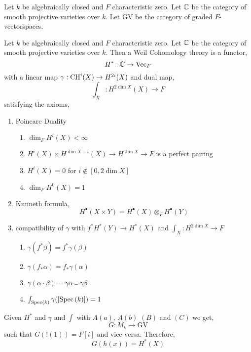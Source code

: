 \documentclass[12pt]{article}
\begin{document}
\newcommand{\GV}{\mathrm{GV}}
\newcommand{\ch}{\mathrm{ch}}
\newcommand{\finfield}{\mathbb{F}}

\begin{definition}
Let $k$ be algebraically closed and $F$ characteristic zero. Let $\mathbb{C}$ be the category of smooth projective varieties over $k$. Let $\GV$ be the category of graded $F$-vectorspaces. 
\end{definition}

\begin{definition}
Let $k$ be algebraically closed and $F$ characteristic zero. Let $\mathbb{C}$ be the category of smooth projective varieties over $k$. Then a Weil Cohomology theory is a functor,
\[ H^* : \mathbb{C} \to \mathrm{Vec}_F \]
with a linear map $\gamma : \mathrm{CH}^i(X) \to H^{2i}(X)$ and dual map,
\[ \int_X : H^{2 \dim{X}}(X) \to F \] 
satisfying the axioms,
\begin{enumerate}
\item Poincare Duality
\begin{enumerate}
\item $\dim_F H^i(X) < \infty$
\item $H^i(X) \times H^{\dim{X} - i}(X) \to H^{\dim{X}}  \to F$ is a perfect pairing
\item $H^i(X) = 0$ for $i \notin [0, 2 \dim{X}]$
\item $\dim_F H^0(X) = 1$
\end{enumerate}
\item Kunneth formula,
\[ H^\bullet(X \times Y) = H^\bullet(X) \otimes_F H^\bullet(Y) \]
\item compatibility of $\gamma$ with $f^* H^*(Y) \to H^*(X)$ and $\int_X : H^{2 \dim{X}} \to F$
\begin{enumerate}
\item $\gamma (f^* \beta) = f^* \gamma( \beta)$
\item $\gamma (f_* \alpha) = f_* \gamma(\alpha)$
\item $\gamma (\alpha \cdot \beta) = \gamma \alpha \smile \gamma \beta$
\item $\int_{\mathrm{Spec}\left( k \right)} \gamma([\mathrm{Spec}\left( k \right)]) = 1$
\end{enumerate}
\end{enumerate}
\end{definition}

\begin{theorem}
Given $H^*$ and $\gamma$ and $\int$ with $A(a)$, $A(b)$ $(B)$ and $(C)$ we get,
\[ G : M_k \to \GV \]
such that $G(!(1)) = F[i]$ and vice versa. Therefore,
\[ G(h(x)) = H^*(X) \]
\end{theorem}
\end{document}
